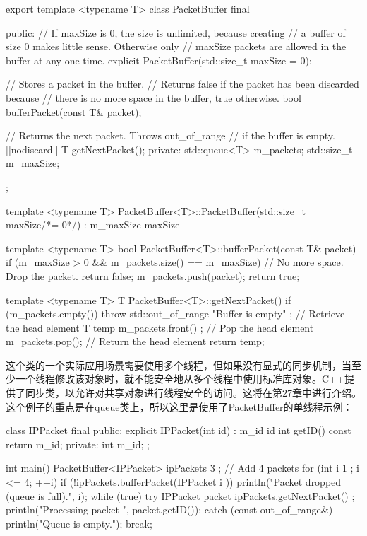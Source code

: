 \begin{cpp}
export template <typename T>
class PacketBuffer final
{
    public:
        // If maxSize is 0, the size is unlimited, because creating
        // a buffer of size 0 makes little sense. Otherwise only
        // maxSize packets are allowed in the buffer at any one time.
        explicit PacketBuffer(std::size_t maxSize = 0);

        // Stores a packet in the buffer.
        // Returns false if the packet has been discarded because
        // there is no more space in the buffer, true otherwise.
        bool bufferPacket(const T& packet);

        // Returns the next packet. Throws out_of_range
        // if the buffer is empty.
        [[nodiscard]] T getNextPacket();
    private:
        std::queue<T> m_packets;
        std::size_t m_maxSize;
};

template <typename T> PacketBuffer<T>::PacketBuffer(std::size_t maxSize/*= 0*/)
    : m_maxSize { maxSize }
{}

template <typename T> bool PacketBuffer<T>::bufferPacket(const T& packet)
{
    if (m_maxSize > 0 && m_packets.size() == m_maxSize) {
        // No more space. Drop the packet.
        return false;
    }
    m_packets.push(packet);
    return true;
}

template <typename T> T PacketBuffer<T>::getNextPacket()
{
    if (m_packets.empty()) {
        throw std::out_of_range { "Buffer is empty" };
    }
    // Retrieve the head element
    T temp { m_packets.front() };
    // Pop the head element
    m_packets.pop();
    // Return the head element
    return temp;
}
\end{cpp}

这个类的一个实际应用场景需要使用多个线程，但如果没有显式的同步机制，当至少一个线程修改该对象时，就不能安全地从多个线程中使用标准库对象。C++提供了同步类，以允许对共享对象进行线程安全的访问。这将在第27章中进行介绍。这个例子的重点是在queue类上，所以这里是使用了PacketBuffer的单线程示例：

\begin{cpp}
class IPPacket final
{
    public:
        explicit IPPacket(int id) : m_id { id } {}
        int getID() const { return m_id; }
    private:
        int m_id;
};

int main()
{
    PacketBuffer<IPPacket> ipPackets { 3 };
    // Add 4 packets
    for (int i { 1 }; i <= 4; ++i) {
        if (!ipPackets.bufferPacket(IPPacket { i })) {
            println("Packet {} dropped (queue is full).", i);
        }
    }
    while (true) {
        try {
            IPPacket packet { ipPackets.getNextPacket() };
            println("Processing packet {}", packet.getID());
        } catch (const out_of_range&) {
            println("Queue is empty.");
            break;
        }
    }
}
\end{cpp}

